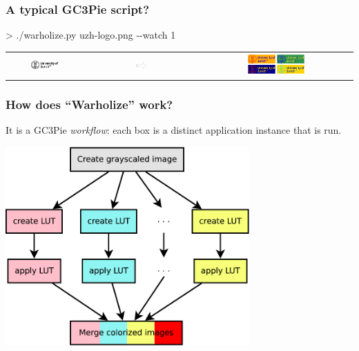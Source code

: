 \documentclass[english,serif,mathserif,usenames,dvipsnames]{beamer}
\begin{document}
\begin{frame}
  \frametitle{A typical GC3Pie script?}

\begin{semiverbatim}
    > ./warholize.py uzh-logo.png -{}-watch 1
\end{semiverbatim}

  \begin{tabular}[c]{ccc}
    \includegraphics[width=0.4\textwidth]{fig/uzh-logo.png}
    &
    \includegraphics[width=0.1\textwidth]{fig/arrow.pdf}
    &
    \includegraphics[width=0.4\textwidth]{fig/warholized-uzh-logo.png}
  \end{tabular}
\end{frame}


\begin{frame}
  \frametitle{How does ``Warholize'' work?}

  \begin{center}
    It is a GC3Pie \emph{workflow}: each box is a distinct application
    instance that is run.

    \+
    \includegraphics[width=0.70\textwidth]{fig/warholize-wkf}
  \end{center}
\end{frame}
\end{document}
